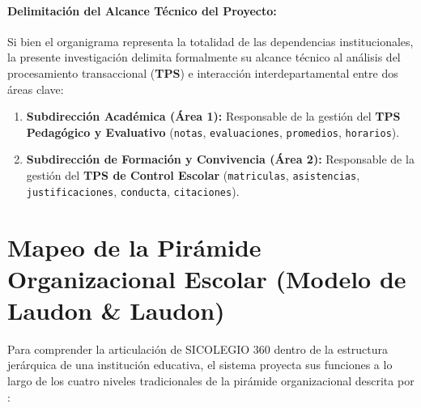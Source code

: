 \documentclass[12pt,a4paper,oneside]{report}
\begin{document}
\paragraph{Delimitación del Alcance Técnico del Proyecto:}
Si bien el organigrama representa la totalidad de las dependencias institucionales, la presente investigación delimita formalmente su alcance técnico al análisis del procesamiento transaccional (\textbf{TPS}) e interacción interdepartamental entre dos áreas clave:
\begin{enumerate}
    \item \textbf{Subdirección Académica (Área 1):} Responsable de la gestión del \textbf{TPS Pedagógico y Evaluativo} (\texttt{notas}, \texttt{evaluaciones}, \texttt{promedios}, \texttt{horarios}).
    \item \textbf{Subdirección de Formación y Convivencia (Área 2):} Responsable de la gestión del \textbf{TPS de Control Escolar} (\texttt{matriculas}, \texttt{asistencias}, \texttt{justificaciones}, \texttt{conducta}, \texttt{citaciones}).
\end{enumerate}

\section{Mapeo de la Pirámide Organizacional Escolar (Modelo de Laudon \& Laudon)}

    Para comprender la articulación de SICOLEGIO 360 dentro de la estructura jerárquica de una institución educativa, el sistema proyecta sus funciones a lo largo de los cuatro niveles tradicionales de la pirámide organizacional descrita por \citet{laudon2016}:
\end{document}

